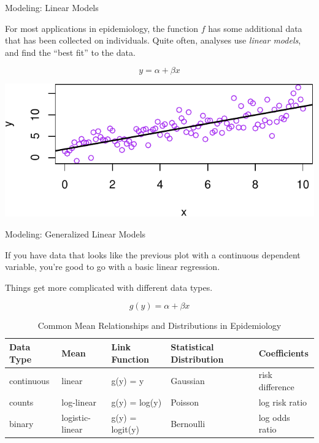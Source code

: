 \documentclass[ignorenonframetext,]{beamer}
\begin{document}
\begin{frame}{Modeling: Linear Models}
\protect\hypertarget{modeling-linear-models}{}

For most applications in epidemiology, the function \(f\) has some
additional data that has been collected on individuals. Quite often,
analyses use \emph{linear models}, and find the ``best fit'' to the
data.

\[
y = \alpha + \beta x
\]

\includegraphics{biostats_I_files/figure-beamer/unnamed-chunk-1-1.pdf}

\end{frame}

\begin{frame}{Modeling: Generalized Linear Models}
\protect\hypertarget{modeling-generalized-linear-models}{}

If you have data that looks like the previous plot with a continuous
dependent variable, you're good to go with a basic linear regression.

Things get more complicated with different data types.

\[
g(y) = \alpha + \beta x
\]

\begin{table}[!h]

\caption{\label{tab:table2}Common Mean Relationships and Distributions in Epidemiology}
\centering
\fontsize{8}{10}\selectfont
\begin{tabular}{l|l|l|l|l}
\hline
\textbf{Data Type} & \textbf{Mean} & \textbf{Link Function} & \textbf{Statistical Distribution} & \textbf{Coefficients}\\
\hline
continuous & linear & g(y) = y & Gaussian & risk difference\\
\hline
counts & log-linear & g(y) = log(y) & Poisson & log risk ratio\\
\hline
binary & logistic-linear & g(y) = logit(y) & Bernoulli & log odds ratio\\
\hline
\end{tabular}
\end{table}

\end{frame}
\end{document}
